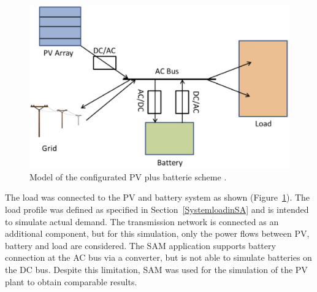 \begin{figure}[!b]  
\centering
\includegraphics[width=0.6\linewidth]{FIG/PV_model_config}
\caption[Model of the configurated PV plus batterie scheme.]{Model of the configurated PV plus batterie scheme \cite{Diorio2015}.}\label{PV_model_config}
\end{figure}

The load was connected to the \ac{PV} and battery system as shown (Figure~\ref{PV_model_config}). The load profile was defined as specified in Section~\ref{SystemloadinSA} and is intended to simulate actual demand. The transmission network is connected as an additional component, but for this simulation, only the power flows between \ac{PV}, battery and load are considered. The \ac{SAM} application supports battery connection at the \ac{AC} bus via a converter, but is not able to simulate batteries on the \ac{DC} bus. Despite this limitation, \ac{SAM} was used for the simulation of the \ac{PV} plant to obtain comparable results.


